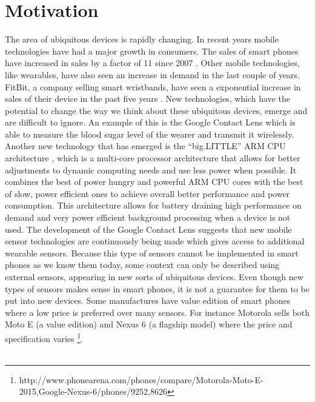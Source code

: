 
\section{Motivation}
\label{sec:motivation}
The area of ubiquitous devices is rapidly changing. In recent years mobile technologies have had a major growth in consumers. The sales of smart phones have increased in sales by a factor of 11 since 2007 \parencite{statsia_smartphones}. Other mobile technologies, like wearables, have also seen an increase in demand in the last couple of years. FitBit, a company selling smart wristbands, have seen a exponential increase in sales of their device in the past five years \parencite{statsia_fitbit}. New technologies, which have the potential to change the way we think about these ubiquitous devices, emerge and are difficult to ignore. An example of this is the Google Contact Lens \parencite{google_contact_lens} which is able to measure the blood sugar level of the wearer and transmit it wirelessly. Another new technology that has emerged is the ``big.LITTLE'' ARM CPU architecture \parencite{big_little_architecture}, which is a multi-core processor architecture that allows for better adjustments to dynamic computing needs and use less power when possible. It combines the best of power hungry and powerful ARM CPU cores with the best of slow, power efficient ones to achieve overall better performance and power consumption. This architecture allows for battery draining high performance on demand and very power efficient background processing when a device is not used. The development of the Google Contact Lens suggests that new mobile sensor technologies are continuously being made which gives access to additional wearable sensors. Because this type of sensors cannot be implemented in smart phones as we know them today, some context can only be described using external sensors, appearing in new sorts of ubiquitous devices. Even though new types of sensors makes sense in smart phones, it is not a guarantee for them to be put into new devices. Some manufactures have value edition of smart phones where a low price is preferred over many sensors. For instance Motorola sells both Moto E (a value edition) and Nexus 6 (a flagship model) where the price and specification varies \footnote{http://www.phonearena.com/phones/compare/Motorola-Moto-E-2015,Google-Nexus-6/phones/9252,8626}.
\\\\

